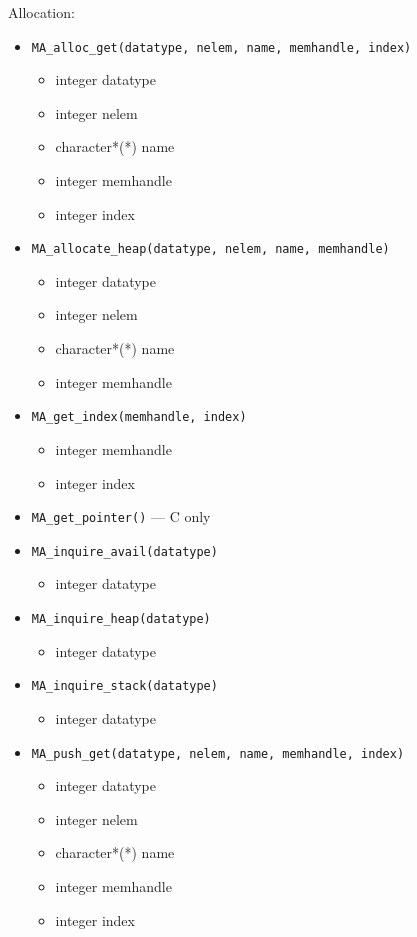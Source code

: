 Allocation:
\begin{itemize}
\item {\tt MA\_alloc\_get(datatype, nelem, name, memhandle, index)}
\begin{itemize}
\item      integer datatype
\item      integer nelem
\item      character*(*) name
\item      integer memhandle
\item      integer index
\end{itemize}

\item {\tt MA\_allocate\_heap(datatype, nelem, name, memhandle)}
\begin{itemize}
\item      integer datatype
\item      integer nelem
\item      character*(*) name
\item      integer memhandle
\end{itemize}

\item {\tt MA\_get\_index(memhandle, index)}
\begin{itemize}
\item      integer memhandle
\item      integer index
\end{itemize}

\item {\tt MA\_get\_pointer()} --- C only
\item {\tt MA\_inquire\_avail(datatype)}
\begin{itemize}
\item      integer datatype
\end{itemize}

\item {\tt MA\_inquire\_heap(datatype)}
\begin{itemize}
\item      integer datatype
\end{itemize}

\item {\tt MA\_inquire\_stack(datatype)}
\begin{itemize}
\item      integer datatype
\end{itemize}

\item {\tt MA\_push\_get(datatype, nelem, name, memhandle, index)}
\begin{itemize}
\item      integer datatype
\item      integer nelem
\item      character*(*) name
\item      integer memhandle
\item      integer index
\end{itemize}


\end{itemize}
